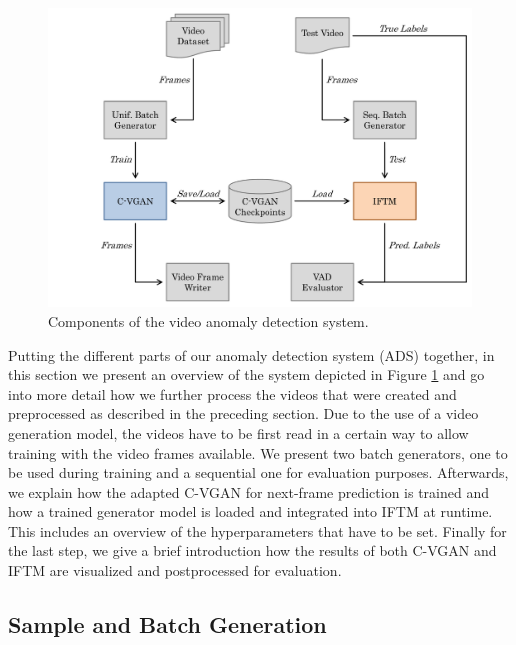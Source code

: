 \begin{figure}
	\centering
	\includegraphics[width=1\textwidth]{graphics/anomalyDetection/ads/system/system.pdf}
  \caption[Components of the video anomaly detection system.]{Components of the video anomaly detection system.}
  \label{fig:ads_overview}
\end{figure}

Putting the different parts of our anomaly detection system (ADS) together, in this section we present an overview of the system depicted in Figure \ref{fig:ads_overview} and go into more detail how we further process the videos that were created and preprocessed as described in the preceding section. Due to the use of a video generation model, the videos have to be first read in a certain way to allow training with the video frames available. We present two batch generators, one to be used during training and a sequential one for evaluation purposes. Afterwards, we explain how the adapted C-VGAN for next-frame prediction is trained and how a trained generator model is loaded and integrated into IFTM at runtime. This includes an overview of the hyperparameters that have to be set. Finally for the last step, we give a brief introduction how the results of both C-VGAN and IFTM are visualized and postprocessed for evaluation.


\subsection{Sample and Batch Generation} \label{subsec:batch_generation}

